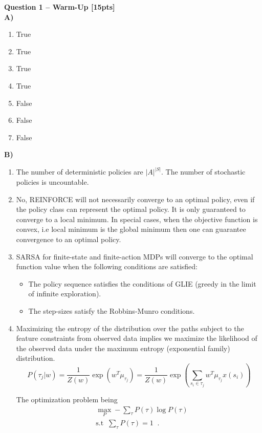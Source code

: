 \newpage
\textbf{\Large Question 1 -- Warm-Up \hfill [15pts]} \\

\textbf{A)}

\begin{enumerate}
\item True
\item True
\item True
\item True
\item False
\item False
\item False
\end{enumerate}

\textbf{B)}
\begin{enumerate}
\item The number of deterministic policies are $|A|^{|S|}$. The number of stochastic policies is uncountable.

\item No, REINFORCE will not necessarily converge to an optimal policy, even if the policy class can represent the optimal policy. It is only guaranteed to converge to a local minimum. In special cases, when the objective function is convex, i.e local minimum is the global minimum then one can guarantee convergence to an optimal policy.

\item SARSA for finite-state and finite-action MDPs will converge to the optimal function value when the following conditions are satisfied:
\begin{itemize}
\item The policy sequence satisfies the conditions of GLIE (greedy in the limit of infinite exploration).
\item The step-sizes satisfy the Robbins-Munro conditions.
\end{itemize}

\item Maximizing the entropy of the distribution over the paths subject to the feature constraints from observed data implies we maximize the likelihood of the observed data under the maximum entropy (exponential family) distribution.
\begin{equation}
P(\tau_j|w) = \frac{1}{Z(w)} \exp(w^T \mu_{\tau_j}) = \frac{1}{Z(w)} \exp\left(\sum_{s_i \in \tau_j} w^T \mu_{\tau_j} x(s_i) \right)
\end{equation}

The optimization problem being
\begin{equation}
\begin{split}
& \max_P - \sum_{\tau} P(\tau)\log P(\tau) \\
& \text{s.t} \;\; \sum_{\tau} P(\tau) = 1 \;\;.
\end{split}
\end{equation}

\end{enumerate}
